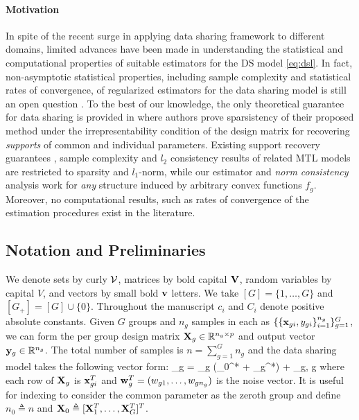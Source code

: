 \paragraph{Motivation} In spite of the recent surge in applying data sharing framework to different domains, limited advances have been made in
understanding the statistical and computational properties of suitable estimators for the DS model \cref{eq:dsl}.
In fact, non-asymptotic statistical properties, including sample complexity and statistical rates of convergence, of regularized estimators for the data sharing model is still an open question \cite{grti16, olvi14}.
To the best of our knowledge, the only theoretical guarantee for data sharing is provided in \cite{olvi15} where authors prove sparsistency of their proposed method under the irrepresentability condition of the design matrix for recovering \emph{supports} of common and individual parameters.
Existing support recovery guarantees \cite{olvi15}, sample complexity and $l_2$ consistency results \cite{jrsr10} of related MTL models are restricted to sparsity and $l_1$-norm, while our estimator and \emph{norm consistency} analysis work for \emph{any} structure induced by arbitrary convex functions $f_g$. 
Moreover, no computational results, such as rates of convergence of the estimation procedures exist in the literature.


\subsection{Notation and Preliminaries}
We denote sets by curly $\cV$, matrices by bold capital $\mathbf{V}$, random variables by capital $V$, and vectors by small bold $\mathbf{v}$ letters.
We take $[G] = \{1, \dots, G\}$ and $[G_+] = [G] \cup \{0\}$. Throughout the manuscript $c_i$ and $C_i$ denote positive absolute constants.
Given $G$ groups and $n_g$ samples in each as $\{ \{\mathbf{x}_{gi}, y_{gi} \}_{i=1}^{n_g} \}_{g = 1}^G$, we can form the per group design matrix $\mathbf{X}_g \in \mathbb R^{n_g \times p}$ and output vector $\mathbf{y}_g \in \mathbb R ^{n_g}$.
The total number of samples is  $n = \sum_{g = 1}^{G} n_g$ and the data sharing model takes the following vector form:
\beq \label{eq:dirtymodel}
\y_g = \X_g (\bbeta _0^* + \bbeta _g^*) + \w_g,  \quad \forall g \in [G]
\eeq
where each row of $\mathbf{X}_g$ is $\mathbf{x}_{gi}^T$ and $\mathbf{w}_g^T = (w_{g1}, \dots, w_{gn_g})$ is the noise vector. It is useful for indexing to consider the common parameter as the zeroth group and define $n_0 \triangleq n$ and $\mathbf{X}_0 \triangleq [\mathbf{X}_1^T, \dots, \mathbf{X}_G^T]^T$.


